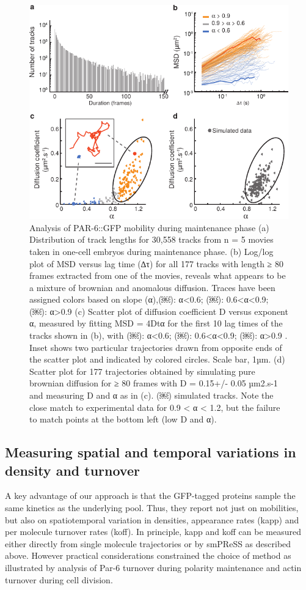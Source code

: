   \begin{figure}[h!]
  	\centering
  	\includegraphics[width=0.8\hsize]{nmeth/Fig3}
  	\caption{\label{fig:fig3}Analysis of PAR-6::GFP mobility during maintenance phase (a) Distribution of track lengths for 30,558 tracks from n = 5 movies taken in one-cell embryos during maintenance phase. (b) Log/log plot of MSD versus lag time (∆τ) for all 177 tracks with length ≥ 80 frames extracted from one of the movies, reveals what appears to be a mixture of brownian and anomalous diffusion. Traces have been assigned colors based on slope (α),(￼): α<0.6; (￼): 0.6<α<0.9; (￼): α>0.9 (c) Scatter plot of diffusion coefficient D versus exponent α, measured by fitting MSD = 4Dtα for the first 10 lag times of the tracks shown in (b), with (￼): α<0.6; (￼): 0.6<α<0.9; (￼): α>0.9 . Inset shows two particular trajectories drawn from opposite ends of the scatter plot and indicated by colored circles. Scale bar, 1µm. (d) Scatter plot for 177 trajectories obtained by simulating pure brownian diffusion for ≥ 80 frames with D = 0.15+/- 0.05 µm2.s-1 and measuring D and α as in (c). (￼) simulated tracks. Note the close match to experimental data for 0.9 < α < 1.2, but the failure to match points at the bottom left (low D and α). }
  \end{figure}
 

 
 
 \subsection{Measuring spatial and temporal variations in density and turnover}
 
 A key advantage of our approach is that the GFP-tagged proteins sample the same kinetics as the underlying pool. Thus, they report not just on mobilities, but also on spatiotemporal variation in densities, appearance rates (kapp) and per molecule turnover rates (koff). In principle, kapp and koff can be measured either directly from single molecule trajectories or by smPReSS as described above. However practical considerations constrained the choice of method as illustrated by analysis of Par-6 turnover during polarity maintenance and actin turnover during cell division.
 
